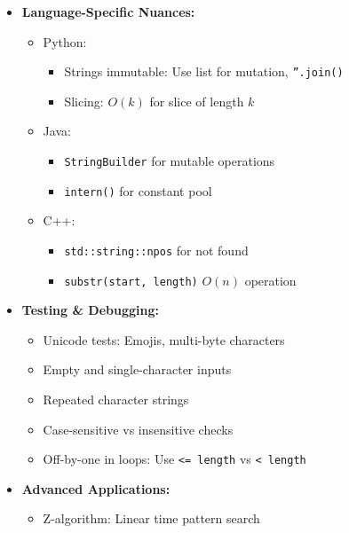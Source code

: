 \documentclass[a4paper,10pt]{book}
\begin{document}
\begin{itemize}
    \item \textbf{Language-Specific Nuances:}
    \begin{itemize}
        \item Python:
        \begin{itemize}
            \item Strings immutable: Use list for mutation, \texttt{''.join()}
            \item Slicing: $O(k)$ for slice of length $k$
        \end{itemize}
        \item Java:
        \begin{itemize}
            \item \texttt{StringBuilder} for mutable operations
            \item \texttt{intern()} for constant pool
        \end{itemize}
        \item C++:
        \begin{itemize}
            \item \texttt{std::string::npos} for not found
            \item \texttt{substr(start, length)} $O(n)$ operation
        \end{itemize}
    \end{itemize}
    
    \item \textbf{Testing \& Debugging:}
    \begin{itemize}
        \item Unicode tests: Emojis, multi-byte characters
        \item Empty and single-character inputs
        \item Repeated character strings
        \item Case-sensitive vs insensitive checks
        \item Off-by-one in loops: Use \texttt{<= length} vs \texttt{< length}
    \end{itemize}
    
    \item \textbf{Advanced Applications:}
    \begin{itemize}
        \item Z-algorithm: Linear time pattern search
    \end{itemize}
\end{itemize}
\end{document}
